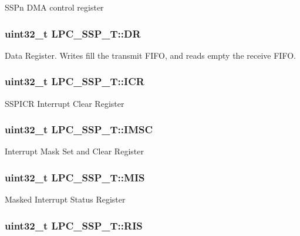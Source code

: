 S\-S\-Pn D\-M\-A control register \hypertarget{structLPC__SSP__T_a7a32964f3ca72981b80cf4012c515ea8}{
\subsubsection[{D\-R}]{ uint32\-\_\-t L\-P\-C\-\_\-\-S\-S\-P\-\_\-\-T\-::\-D\-R}}\label{structLPC__SSP__T_a7a32964f3ca72981b80cf4012c515ea8}
Data Register. Writes fill the transmit F\-I\-F\-O, and reads empty the receive F\-I\-F\-O. \hypertarget{structLPC__SSP__T_ad788fb9f7178c7a79588b429f74b9946}{
\subsubsection[{I\-C\-R}]{ uint32\-\_\-t L\-P\-C\-\_\-\-S\-S\-P\-\_\-\-T\-::\-I\-C\-R}}\label{structLPC__SSP__T_ad788fb9f7178c7a79588b429f74b9946}
S\-S\-P\-I\-C\-R Interrupt Clear Register \hypertarget{structLPC__SSP__T_a5969572eaab7a02f4bbd7c898f93ca73}{
\subsubsection[{I\-M\-S\-C}]{ uint32\-\_\-t L\-P\-C\-\_\-\-S\-S\-P\-\_\-\-T\-::\-I\-M\-S\-C}}\label{structLPC__SSP__T_a5969572eaab7a02f4bbd7c898f93ca73}
Interrupt Mask Set and Clear Register \hypertarget{structLPC__SSP__T_aa4b72809de09f83335e72d0d0844a90b}{
\subsubsection[{M\-I\-S}]{ uint32\-\_\-t L\-P\-C\-\_\-\-S\-S\-P\-\_\-\-T\-::\-M\-I\-S}}\label{structLPC__SSP__T_aa4b72809de09f83335e72d0d0844a90b}
Masked Interrupt Status Register \hypertarget{structLPC__SSP__T_a0aa742f8d7d4b2e2a6038b01dbc1aa5b}{
\subsubsection[{R\-I\-S}]{ uint32\-\_\-t L\-P\-C\-\_\-\-S\-S\-P\-\_\-\-T\-::\-R\-I\-S}}\label{structLPC__SSP__T_a0aa742f8d7d4b2e2a6038b01dbc1aa5b}
